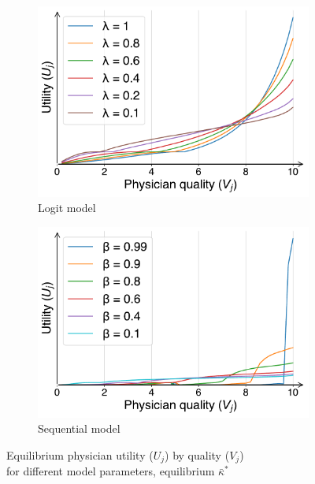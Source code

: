 \documentclass[../main.tex]{subfiles}
\begin{document}
\begin{figure}[H]
    \centering
    \begin{subfigure}[b]{0.46\linewidth}
        \centering
        \includegraphics[width=\linewidth]{U.pdf}
        \vspace{-0.6cm}
        \caption{Logit model}
        \label{fig:logit_U}
    \end{subfigure}
    \hspace{0.05\linewidth}  %
    \begin{subfigure}[b]{0.46\linewidth}
        \centering
        \includegraphics[width=\linewidth]{schnell_U.pdf}
        \vspace{-0.6cm}
        \caption{Sequential model}
        \label{fig:schnell_U}
    \end{subfigure}
    \caption{Equilibrium physician utility ($U_j$) by quality ($V_j$) \\ for different model parameters, equilibrium $\bar{\kappa}^*$}
    \label{fig:physician_U}
\end{figure}
\end{document}
